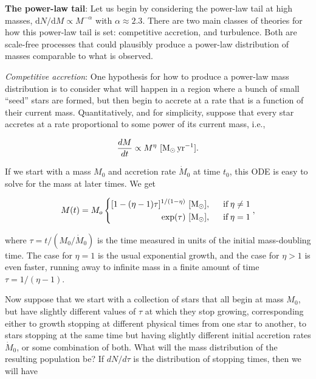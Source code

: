 \documentclass[a4paper,10pt]{article}
\begin{document}
{\noindent}\textbf{The power-law tail}: Let us begin by considering the power-law tail at high masses, $\mathrm{d}N/\mathrm{d}M\propto M^{-\alpha}$ with $\alpha\approx2.3$. There are two main classes of theories for how this power-law tail is set: competitive accretion, and turbulence. Both are scale-free processes that could plausibly produce a power-law distribution of masses comparable to what is observed.

{\noindent}\textit{Competitive accretion}: One hypothesis for how to produce a power-law mass distribution is to consider what will happen in a region where a bunch of small ``seed'' stars are formed, but then begin to accrete at a rate that is a function of their current mass. Quantitatively, and for simplicity, suppose that every star accretes at a rate proportional to some power of its current mass, i.e.,

\begin{align*}
    \frac{dM}{dt} \propto M^\eta ~ [{\rm M_\odot\,yr^{-1}}].
\end{align*}

{\noindent}If we start with a mass $M_0$ and accretion rate $\dot{M}_0$ at time $t_0$, this ODE is easy to solve for the mass at later times. We get

\begin{equation*}
M(t) = M_o
\left\{
\begin{aligned}
[1-(\eta-1)\tau]^{1/(1-\eta)} ~ [{\rm M_\odot}], ~~~~~& \mathrm{if}\,\eta\neq1 \\
\exp(\tau) ~ [{\rm M_\odot}], ~~~~~& \mathrm{if}\,\eta=1
\end{aligned}
\right.
,
\end{equation*}

{\noindent}where $\tau=t/(M_0/\dot{M}_0)$ is the time measured in units of the initial mass-doubling time. The case for $\eta=1$ is the usual exponential growth, and the case for $\eta>1$ is even faster, running away to infinite mass in a finite amount of time $\tau=1/(\eta-1)$.

{\noindent}Now suppose that we start with a collection of stars that all begin at mass $M_0$, but have slightly different values of $\tau$ at which they stop growing, corresponding either to growth stopping at different physical times from one star to another, to stars stopping at the same time but having slightly different initial accretion rates $\dot{M}_0$, or some combination of both. What will the mass distribution of the resulting population be? If $dN/d\tau$ is the distribution of stopping times, then we will have
\end{document}
